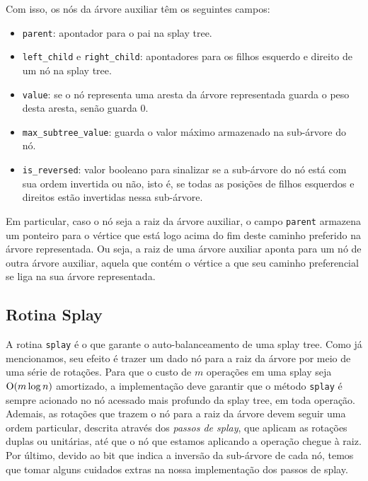 Com isso, os nós da árvore auxiliar têm os seguintes campos:

\begin{itemize}
    \item \texttt{parent}: apontador para o pai na splay tree.
    \item \texttt{left\_child} e \texttt{right\_child}: apontadores para os filhos esquerdo e direito de um nó na splay tree.
    \item \texttt{value}: se o nó representa uma aresta da árvore representada guarda o peso desta aresta, senão guarda 0.
    \item \texttt{max\_subtree\_value}: guarda o valor máximo armazenado na sub-árvore do nó.
    \item \texttt{is\_reversed}: valor booleano para sinalizar se a sub-árvore do nó está com sua ordem invertida ou não, isto é, se todas as posições de filhos esquerdos e direitos estão  invertidas nessa  sub-árvore.
\end{itemize}

Em particular, caso o nó seja a raiz da árvore auxiliar, o campo \texttt{parent} armazena um ponteiro para o vértice que está logo acima do fim deste caminho preferido na árvore representada. Ou seja, a raiz de uma árvore auxiliar aponta para um nó de outra árvore auxiliar, aquela que contém o vértice a que seu caminho preferencial se liga na sua árvore representada.

\subsection{Rotina Splay}
\label{subsection:lct-splay-splay}

A rotina \texttt{splay} é o que garante o auto-balanceamento de uma splay tree. Como já mencionamos, seu efeito é trazer um dado nó para a raiz da árvore por meio de uma série de rotações. Para que o custo de $m$ operações em uma splay seja $\mathrm{O} (m \log n) $ amortizado, a implementação deve garantir que o método \texttt{splay} é sempre acionado no nó acessado mais profundo da splay tree, em toda operação. Ademais, as rotações que trazem o nó para a raiz da árvore devem seguir uma ordem particular, descrita através dos \emph{passos de splay}, que aplicam as rotações duplas ou unitárias, até que o nó que estamos aplicando a operação chegue à raiz. Por último, devido ao bit que indica a inversão da sub-árvore de cada nó, temos que tomar alguns cuidados extras na nossa implementação dos passos de splay.

